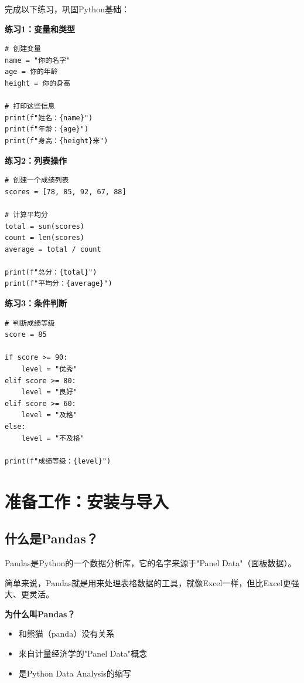 \documentclass[12pt,a4paper]{article}
\begin{document}
\begin{practicebox}
完成以下练习，巩固Python基础：

\textbf{练习1：变量和类型}
\begin{lstlisting}
# 创建变量
name = "你的名字"
age = 你的年龄
height = 你的身高

# 打印这些信息
print(f"姓名：{name}")
print(f"年龄：{age}")
print(f"身高：{height}米")
\end{lstlisting}

\textbf{练习2：列表操作}
\begin{lstlisting}
# 创建一个成绩列表
scores = [78, 85, 92, 67, 88]

# 计算平均分
total = sum(scores)
count = len(scores)
average = total / count

print(f"总分：{total}")
print(f"平均分：{average}")
\end{lstlisting}

\textbf{练习3：条件判断}
\begin{lstlisting}
# 判断成绩等级
score = 85

if score >= 90:
    level = "优秀"
elif score >= 80:
    level = "良好"
elif score >= 60:
    level = "及格"
else:
    level = "不及格"

print(f"成绩等级：{level}")
\end{lstlisting}
\end{practicebox}

\section{准备工作：安装与导入}

\subsection{什么是Pandas？}

\begin{knowledgebox}
Pandas是Python的一个数据分析库，它的名字来源于"Panel Data"（面板数据）。

简单来说，Pandas就是用来处理表格数据的工具，就像Excel一样，但比Excel更强大、更灵活。

\textbf{为什么叫Pandas？}
\begin{itemize}
    \item 和熊猫（panda）没有关系
    \item 来自计量经济学的"Panel Data"概念
    \item 是Python Data Analysis的缩写
\end{itemize}
\end{knowledgebox}
\end{document}
